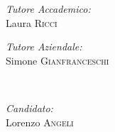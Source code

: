 \begin{titlepage}


\begin{minipage}{0.4\textwidth}
\begin{flushleft} \large
\emph{Tutore Accademico:}\\
Laura \textsc{Ricci} \\
\end{flushleft}
\begin{flushleft} \large
\emph{Tutore Aziendale:} \\
Simone \textsc{Gianfranceschi} \\
\end{flushleft}
\end{minipage} 
~
\begin{minipage}{0.4\textwidth}
\begin{flushright} \large
\emph{Candidato:} \\
Lorenzo \textsc{Angeli} \\
\end{flushright}
\end{minipage}\\[2cm]

\hrulefill
\vspace{5mm}
\\

\end{titlepage}